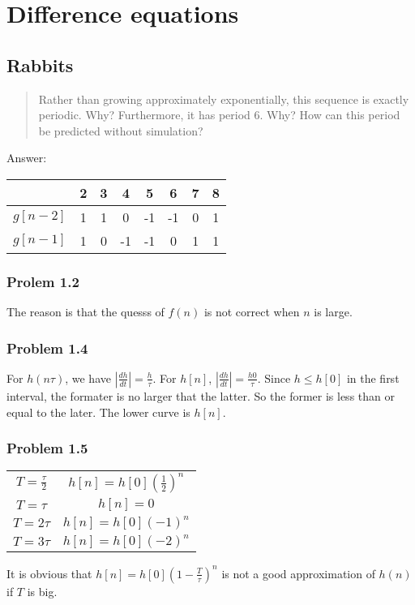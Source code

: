 \documentclass{book}
\begin{document}
\chapter{Difference equations}

\section{Rabbits}

\begin{quote}
  Rather than growing approximately exponentially, this sequence is exactly periodic. Why? Furthermore, it has period 6.
  Why? How can this period be predicted without simulation?
\end{quote}

Answer:
\begin{center}
\begin{tabular}{ |c|c|c|c|c|c|c|c| } 
 \hline
           & 2 & 3 & 4  & 5  & 6  & 7 & 8 \\
\hline \hline
  $g[n-2]$ & 1 & 1 & 0  & -1 & -1 & 0 & 1 \\ 
  \hline
  $g[n-1]$ & 1 & 0 & -1 & -1 & 0  & 1 & 1 \\ 
 \hline
\end{tabular}
\end{center}

\subsection*{Prolem 1.2}
The reason is that the quesss of $f(n)$ is not correct when $n$ is large.

\subsection*{Problem 1.4}
For $h(n\tau)$, we have $|\frac{dh}{dt}| = \frac{h}{\tau}$. For $h[n]$, $|\frac{dh}{dt}|=\frac{h{0}}{\tau}$. Since $h \le h[0]$ in the first interval, the
formater is no larger that the latter. So the former is less than or equal to the later. The lower curve is $h[n]$.

\subsection*{Problem 1.5}
\begin{center}
  \begin{tabular}{c|c}
    $T = \frac{\tau}{2}$ & $h[n]=h[0](\frac{1}{2})^n$ \\
    $T = \tau$ & $h[n] = 0$ \\
    $T = 2\tau$ & $h[n] = h[0](-1)^n$ \\
    $T = 3\tau$ & $h[n] = h[0](-2)^n$ \\
  \end{tabular}
\end{center}
It is obvious that $h[n] = h[0](1-\frac{T}{\tau})^n$ is not a good approximation of $h(n)$ if $T$ is big.
\end{document}

